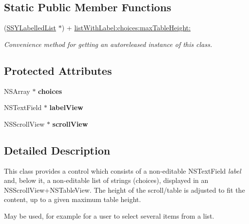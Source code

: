 \subsection*{Static Public Member Functions}
\begin{CompactItemize}
\item 
(\hyperlink{interface_s_s_y_labelled_list}{SSYLabelledList} $\ast$) + \hyperlink{interface_s_s_y_labelled_list_2a5643a553c82edcf83ec234f21923e7}{listWithLabel:choices:maxTableHeight:}
\begin{CompactList}\small\item\em Convenience method for getting an autoreleased instance of this class. \item\end{CompactList}\end{CompactItemize}
\subsection*{Protected Attributes}
\begin{CompactItemize}
\item 
\hypertarget{interface_s_s_y_labelled_list_7d76a6e19adfd33987f653c6ec754fbb}{
NSArray $\ast$ \textbf{choices}}
\label{interface_s_s_y_labelled_list_7d76a6e19adfd33987f653c6ec754fbb}

\item 
\hypertarget{interface_s_s_y_labelled_list_1072969e548c452b1d9083a23546863a}{
NSTextField $\ast$ \textbf{labelView}}
\label{interface_s_s_y_labelled_list_1072969e548c452b1d9083a23546863a}

\item 
\hypertarget{interface_s_s_y_labelled_list_3d47c5c985b2d6be299be3418c71004a}{
NSScrollView $\ast$ \textbf{scrollView}}
\label{interface_s_s_y_labelled_list_3d47c5c985b2d6be299be3418c71004a}

\end{CompactItemize}


\subsection{Detailed Description}
This class provides a control which consists of a non-editable NSTextField {\em label\/} and, below it, a non-editable list of strings (choices), displayed in an NSScrollView+NSTableView. The height of the scroll/table is adjusted to fit the content, up to a given maximum table height. 

May be used, for example for a user to select several items from a list. 

